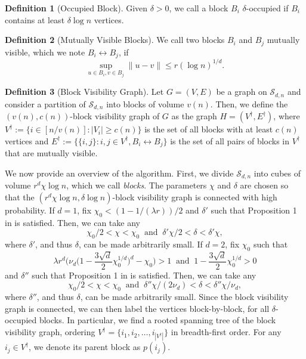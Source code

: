 \documentclass{article}
\newcommand{\1}{\mathbbm{1}}
\newcommand{\calS}{\mathcal{S}}
\newcommand{\visible}{\leftrightarrow{}}
\theoremstyle{definition}
\newtheorem{definition}{Definition}
\theoremstyle{plain}
\begin{document}
\begin{definition}[Occupied Block]
    Given $\delta > 0$, we call a block $B_i$ $\delta$-occupied if $B_i$ contains at least $\delta \log n$ vertices.
\end{definition}

\begin{definition}[Mutually Visible Blocks]
    We call two blocks $B_i$ and $B_j$ mutually visible, which we note $B_i \visible B_j$, if
    \begin{equation*}
        \sup_{u \in B_i, v \in B_j} \|u -v\| \leq r(\log n)^{1/d}.
    \end{equation*}
\end{definition}

\begin{definition}[Block Visibility Graph]
    Let $G = (V, E)$ be a graph on $\calS_{d, n}$ and consider a partition of $\calS_{d, n}$ into blocks of volume $v(n)$. Then, we define the $(v(n), c(n))$-block visibility graph of $G$ as the graph $H = (V^\dagger, E^\dagger)$, where $V^\dagger := \{i \in [n/v(n)] : |V_i| \geq c(n)\}$ is the set of all blocks with at least $c(n)$ vertices and $E^\dagger := \{\{i, j\}: i, j \in V^\dagger, B_i \visible B_j\}$ is the set of all pairs of blocks in $V^\dagger$ that are mutually visible.
\end{definition}



We now provide an overview of the algorithm. First, we divide $\calS_{d, n}$ into cubes of volume $r^d \chi \log n$, which we call \textit{blocks}. The parameters $\chi$ and $\delta$ are chosen so that the $(r^d \chi \log n, \delta \log n)$-block visibility graph is connected with high probability.
If $d = 1$, fix $\chi_0 < (1 - 1/(\lambda r)) / 2$ and $\delta'$ such that Proposition 1 in \cite{GaudioJin2025} is satisfied. Then, we can take any \begin{equation}
\label{eq:chi_delta_conditions_d=1}
    \chi_0/2 < \chi < \chi_0  \: \text{ and } \: \delta' \chi / 2 < \delta < \delta' \chi,
\end{equation}
where $\delta'$, and thus $\delta$, can be made arbitrarily small. If $d = 2$, fix $\chi_0$ such that
\begin{equation*}
    \lambda r^d \bigg(\nu_d \Big(1-\frac{3\sqrt{d}}{2} \chi_0^{1/d} \Big)^d - \chi_0 \bigg) > 1 \: \text{ and } \: 1-\frac{3\sqrt{d}}{2} \chi_0^{1/d} > 0
\end{equation*}
and $\delta''$ such that Proposition 1 in \cite{GaudioJin2025} is satisfied. Then, we can take any 
\begin{equation}
\label{eq:chi_delta_conditions_d>=2}
    \chi_0/2 < \chi < \chi_0 \: \text{ and } \: \delta''\chi / (2 \nu_d) < \delta < \delta''\chi / \nu_d,
\end{equation}
where $\delta''$, and thus $\delta$, can be made arbitrarily small. Since the block visibility graph is connected, we can then label the vertices block-by-block, for all $\delta$-occupied blocks. In particular, we find a rooted spanning tree of the block visibility graph, ordering $V^\dagger = \{i_1, i_2, \ldots, i_{|V^\dagger|}\}$ in breadth-first order. For any $i_j \in V^\dagger$, we denote its parent block as $p(i_j)$.
\end{document}
